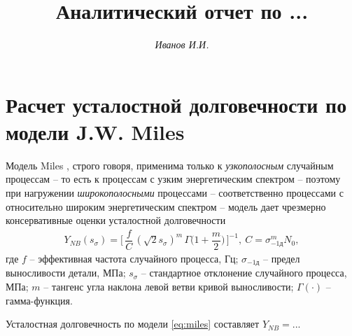 \documentclass{article}
\begin{document}
\title{Аналитический отчет по ...} %
\author{\itshape Иванов И.И.} %
\date{} %
\maketitle %

\thispagestyle{fancy} %

\tableofcontents

\section{Расчет усталостной долговечности по модели J.W. Miles}

Модель Miles \cite{miles-1954}, строго говоря, применима только к \emph{узкополосным} случайным процессам -- то есть к процессам с узким энергетическим спектром -- поэтому при нагружении \emph{широкополосными} процессами -- соответственно процессами с относительно широким энергетическим спектром -- модель дает чрезмерно консервативные оценки усталостной долговечности
\begin{align}\label{eq:miles}
	Y_{NB}(s_{\sigma}) = \Big[ \, \dfrac{f}{C} \, ( \sqrt{2} s_{\sigma} )^m \, \Gamma \bigg( 1 + \dfrac{m}{2} \bigg) \, \Big]^{-1}, \ C = \sigma_{-1\text{д}}^m N_0,
\end{align}
где $ f $ -- эффективная частота случайного процесса, Гц; $ \sigma_{-1\text{д}} $ -- предел выносливости детали, МПа; $ s_{\sigma} $ -- стандартное отклонение случайного процесса, МПа; $ m $ -- тангенс угла наклона левой ветви кривой выносливости; $ \Gamma(\cdot) $ -- гамма-функция.

Усталостная долговечность по модели \eqref{eq:miles} составляет $ Y_{NB} = $...

\begin{thebibliography}{99}
\end{thebibliography}
\end{document}
